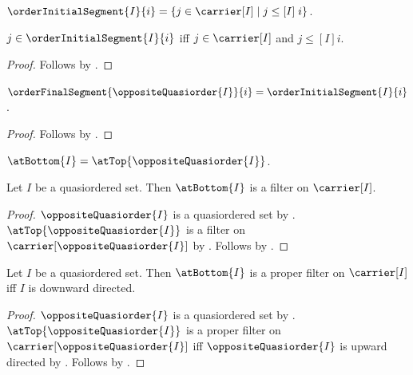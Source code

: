 \begin{definition}\label{order_initial_segment}
    $\orderInitialSegment{I}{i}
        =\{j\in\carrier[I]\mid j\mathrel{\leq[I]}i\}$.
\end{definition}

\begin{proposition}\label{order_initial_segment_iff}
    $j\in\orderInitialSegment{I}{i}$ iff
        $j\in\carrier[I]$ and $j\mathrel{\leq[I]}i$.
\end{proposition}
\begin{proof}
    Follows by .
\end{proof}

\begin{proposition}\label{opposite_final_segment_is_initial_segment}
    $\orderFinalSegment{\oppositeQuasiorder{I}}{i}
        =\orderInitialSegment{I}{i}$.
\end{proposition}
\begin{proof}
    Follows by
        .
\end{proof}

\begin{definition}\label{at_bottom_filter}
    $\atBottom{I}=\atTop{\oppositeQuasiorder{I}}$.
\end{definition}

\begin{classification}\label{at_bottom_is_filter}
    Let $I$ be a quasiordered set.
    Then $\atBottom{I}$ is a filter on $\carrier[I]$.
\end{classification}
\begin{proof}
    $\oppositeQuasiorder{I}$ is a quasiordered set by
        .
    $\atTop{\oppositeQuasiorder{I}}$ is a filter on
        $\carrier[\oppositeQuasiorder{I}]$ by
        .
    Follows by
        .
\end{proof}

\begin{theorem}\label{at_bottom_is_proper_iff_downward_directed}
    Let $I$ be a quasiordered set.
    Then $\atBottom{I}$ is a proper filter on $\carrier[I]$ iff
        $I$ is downward directed.
\end{theorem}
\begin{proof}
    $\oppositeQuasiorder{I}$ is a quasiordered set by
        .
    $\atTop{\oppositeQuasiorder{I}}$ is a proper filter on
        $\carrier[\oppositeQuasiorder{I}]$ iff
        $\oppositeQuasiorder{I}$ is upward directed by
        .
    Follows by
        .
\end{proof}


